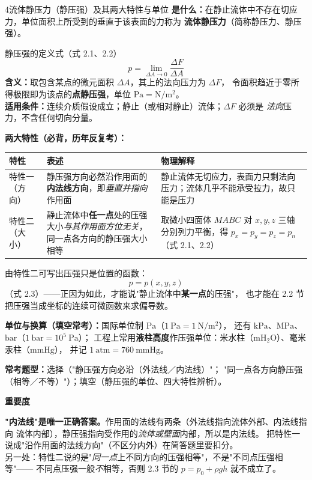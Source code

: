 \begin{kaodian}{4}{流体静压力（静压强）及其两大特性与单位}
\textbf{是什么：}在静止流体中不存在切应力，单位面积上所受到的垂直于该表面的力称为
\textbf{流体静压力}（简称静压力、静压强）。

\begin{gongshi}{静压强的定义式（式 2.1、2.2）}
\[ p=\lim_{\Delta A\to0}\frac{\Delta F}{\Delta A} \]
\textbf{含义：}取包含某点的微元面积 $\Delta A$，其上的法向压力为 $\Delta F$，
令面积趋近于零所得极限即为该点的\textbf{点静压强}，单位 $\mathrm{Pa}=\mathrm{N/m^2}$。\\
\textbf{适用条件：}连续介质假设成立；静止（或相对静止）流体；$\Delta F$ 必须是
\emph{法向}压力，不含任何切向分量。
\end{gongshi}

\textbf{两大特性（必背，历年反复考）：}
\begin{center}
\begin{tabularx}{\textwidth}{@{}lXX@{}}
\toprule
特性 & 表述 & 物理解释 \\
\midrule
特性一（方向） & 静压强方向必然沿作用面的\textbf{内法线方向}，即\emph{垂直并指向}作用面 & 静止流体无切应力，表面力只剩法向压力；流体几乎不能承受拉力，故只能是压力 \\
特性二（大小） & 静止流体中\textbf{任一点}处的压强大小\emph{与其作用面方位无关}，同一点各方向的静压强大小相等 & 取微小四面体 $MABC$ 对 $x,y,z$ 三轴分别列力平衡，得 $p_x=p_y=p_z=p_n$（式 2.1、2.2） \\
\bottomrule
\end{tabularx}
\end{center}

由特性二可写出压强只是位置的函数：
\[ p=p(x,y,z) \]
（式 2.3）——正因为如此，才能说"静止流体中\textbf{某一点}的压强"，
也才能在 2.2 节把压强当成坐标的连续可微函数来求偏导数。

\textbf{单位与换算（填空常考）：}国际单位制 $\mathrm{Pa}$（$1\ \mathrm{Pa}=1\ \mathrm{N/m^2}$），
还有 $\mathrm{kPa}$、$\mathrm{MPa}$、$\mathrm{bar}$（$1\ \mathrm{bar}=10^5\ \mathrm{Pa}$）；
工程上常用\textbf{液柱高度}作压强单位：米水柱（$\mathrm{mH_2O}$）、毫米汞柱（$\mathrm{mmHg}$），
并记 $1\ \mathrm{atm}=760\ \mathrm{mmHg}$。

\textbf{常考题型：}选择（"静压强方向必沿（外法线／内法线）"；
"同一点各方向静压强（相等／不等）"）；填空（静压强的单位、四大特性辨析）。

\textbf{重要度 }\quad{}\quad{}

\begin{yicuo}
\textbf{"内法线"是唯一正确答案。}作用面的法线有两条（外法线指向流体外部、内法线指向
流体内部），静压强指向受作用的\emph{流体或壁面}内部，所以是内法线。
把特性一说成"沿作用面的法线方向"（不区分内外）在简答题里要扣分。\\
另一处：特性二说的是"\emph{同一点}上不同方向的压强相等"，不是"不同点压强相等"——
不同点压强一般\emph{不}相等，否则 2.3 节的 $p=p_0+\rho g h$ 就不成立了。
\end{yicuo}
\end{kaodian}

